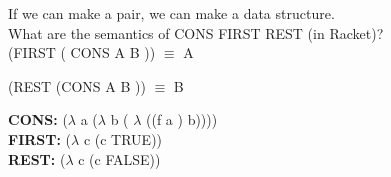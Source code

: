 \documentclass{article}
\begin{document}
\begin{flushleft}
\hspace{5mm} If we can make a pair, we can make a data structure.\\
\vspace{2mm}
\hspace{5mm} What are the semantics of CONS FIRST REST (in Racket)?\\
\vspace{1mm}
\hspace{5mm} (FIRST ( CONS A B )) $\equiv$ A

\hspace{5mm} (REST (CONS A B ))  $\equiv$ B

\vspace{2mm}
\hspace{6mm}\textbf{CONS:} ($\lambda$ a ($\lambda$ b ( $\lambda$ ((f a ) b)))) \\
\vspace{1mm}
\hspace{6mm}\textbf{FIRST:} ($\lambda$ c (c TRUE))\\
\vspace{1mm}
\hspace{6mm}\textbf{REST:} ($\lambda$ c (c FALSE))\\

\end{flushleft}
\end{document}
